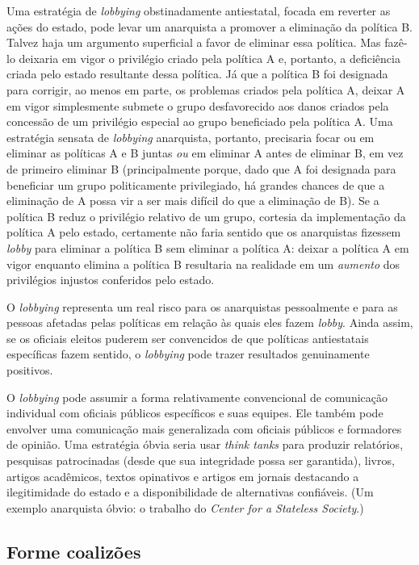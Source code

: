 Uma estratégia de \emph{lobbying} obstinadamente antiestatal, focada em reverter as ações do estado, pode levar um anarquista a promover a eliminação da política B. Talvez haja um argumento superficial a favor de eliminar essa política. Mas fazê-lo deixaria em vigor o privilégio criado pela política A e, portanto, a deficiência criada pelo estado resultante dessa política. Já que a política B foi designada para corrigir, ao menos em parte, os problemas criados pela política A, deixar A em vigor simplesmente submete o grupo desfavorecido aos danos criados pela concessão de um privilégio especial ao grupo beneficiado pela política A. Uma estratégia sensata de \emph{lobbying} anarquista, portanto, precisaria focar ou em eliminar as políticas A e B juntas \emph{ou} em eliminar A antes de eliminar B, em vez de primeiro eliminar B (principalmente porque, dado que A foi designada para beneficiar um grupo politicamente privilegiado, há grandes chances de que a eliminação de A possa vir a ser mais difícil do que a eliminação de B). Se a política B reduz o privilégio relativo de um grupo, cortesia da implementação da política A pelo estado, certamente não faria sentido que os anarquistas fizessem \emph{lobby} para eliminar a política B sem eliminar a política A: deixar a política A em vigor enquanto elimina a política B resultaria na realidade em um \emph{aumento} dos privilégios injustos conferidos pelo estado.

O \emph{lobbying} representa um real risco para os anarquistas pessoalmente e para as pessoas afetadas pelas políticas em relação às quais eles fazem \emph{lobby}. Ainda assim, se os oficiais eleitos puderem ser convencidos de que políticas antiestatais específicas fazem sentido, o \emph{lobbying} pode trazer resultados genuinamente positivos.

O \emph{lobbying} pode assumir a forma relativamente convencional de comunicação individual com oficiais públicos específicos e suas equipes. Ele também pode envolver uma comunicação mais generalizada com oficiais públicos e formadores de opinião. Uma estratégia óbvia seria usar \emph{think tanks} para produzir relatórios, pesquisas patrocinadas (desde que sua integridade possa ser garantida), livros, artigos acadêmicos, textos opinativos e artigos em jornais destacando a ilegitimidade do estado e a disponibilidade de alternativas confiáveis. (Um exemplo anarquista óbvio: o trabalho do \emph{Center for a Stateless Society}.)

\subsection*{Forme coalizões}

